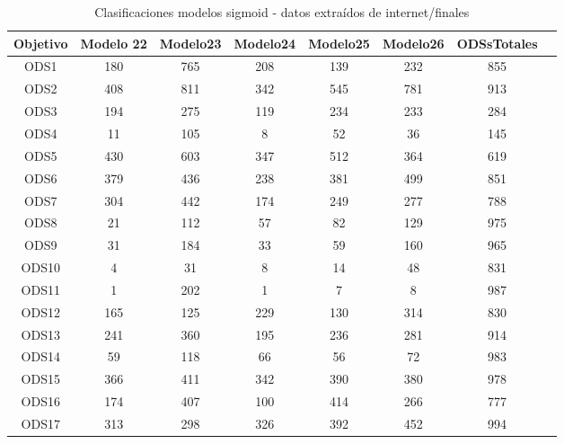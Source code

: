 \begin{table}[H]
    \begin{tabular}{| c || c | c  | c  | c  | c  | c  | c |}
        \hline
        Objetivo & Modelo 22 & Modelo23 & Modelo24 & Modelo25 & Modelo26 & ODSsTotales\\
        \hline \hline
        ODS1   & 180 & 765 & 208 & 139 & 232 & 855\\ \hline
        ODS2   & 408 & 811 & 342 & 545 & 781 & 913\\ \hline
        ODS3   & 194 & 275 & 119 & 234 & 233 & 284\\ \hline
        ODS4   & 11  & 105 & 8   & 52  & 36  & 145\\ \hline
        ODS5   & 430 & 603 & 347 & 512 & 364 & 619\\ \hline
        ODS6   & 379 & 436 & 238 & 381 & 499 & 851\\ \hline
        ODS7   & 304 & 442 & 174 & 249 & 277 & 788\\ \hline
        ODS8   & 21  & 112 & 57  & 82  & 129 & 975\\ \hline
        ODS9   & 31  & 184 & 33  & 59  & 160 & 965\\ \hline
        ODS10  & 4   & 31  & 8   & 14  & 48  & 831\\ \hline
        ODS11  & 1   & 202 & 1   & 7   & 8   & 987\\ \hline
        ODS12  & 165 & 125 & 229 & 130 & 314 & 830\\ \hline
        ODS13  & 241 & 360 & 195 & 236 & 281 & 914\\ \hline
        ODS14  & 59  & 118 & 66  & 56  & 72  & 983\\ \hline
        ODS15  & 366 & 411 & 342 & 390 & 380 & 978\\ \hline
        ODS16  & 174 & 407 & 100 & 414 & 266 & 777\\ \hline
        ODS17  & 313 & 298 & 326 & 392 & 452 & 994\\ \hline
    \end{tabular}
    \caption{Clasificaciones modelos sigmoid - datos extraídos de internet/finales}
    \label{table:Clasificaciones modelos sigmoid - datos extraidos de internet/finales}
\end{table}

